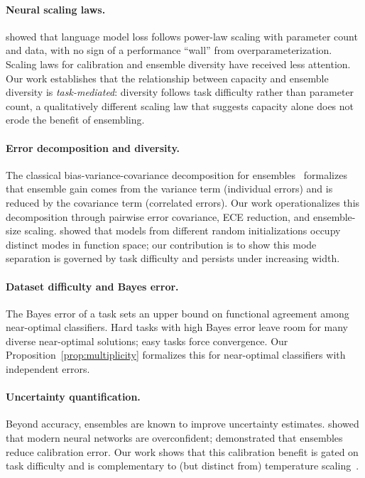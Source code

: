 \documentclass[11pt]{article}
\begin{document}
\paragraph{Neural scaling laws.}
\citet{kaplan2020scaling} showed that language model loss follows power-law
scaling with parameter count and data, with no sign of a performance
``wall'' from overparameterization.  Scaling laws for calibration and
ensemble diversity have received less attention.  Our work establishes
that the relationship between capacity and ensemble diversity is
\emph{task-mediated}: diversity follows task difficulty rather than
parameter count, a qualitatively different scaling law that suggests
capacity alone does not erode the benefit of ensembling.

\paragraph{Error decomposition and diversity.}
The classical bias-variance-covariance decomposition for
ensembles~\citep{krogh1995neural} formalizes that ensemble gain comes from
the variance term (individual errors) and is reduced by the covariance
term (correlated errors).  Our work operationalizes this decomposition
through pairwise error covariance, ECE reduction, and ensemble-size scaling.
\citet{fort2019deep} showed that models from different random
initializations occupy distinct modes in function space; our contribution
is to show this mode separation is governed by task difficulty and persists
under increasing width.

\paragraph{Dataset difficulty and Bayes error.}
The Bayes error of a task sets an upper bound on functional agreement
among near-optimal classifiers.  Hard tasks with high Bayes error leave
room for many diverse near-optimal solutions; easy tasks force
convergence.  Our Proposition~\ref{prop:multiplicity}
formalizes this for near-optimal classifiers with independent errors.

\paragraph{Uncertainty quantification.}
Beyond accuracy, ensembles are known to improve uncertainty estimates.
\citet{guo2017calibration} showed that modern neural networks are
overconfident; \citet{lakshminarayanan2017simple} demonstrated that
ensembles reduce calibration error.  Our work shows that this calibration
benefit is gated on task difficulty and is complementary to (but distinct
from) temperature scaling~\citep{guo2017calibration}.
\end{document}

